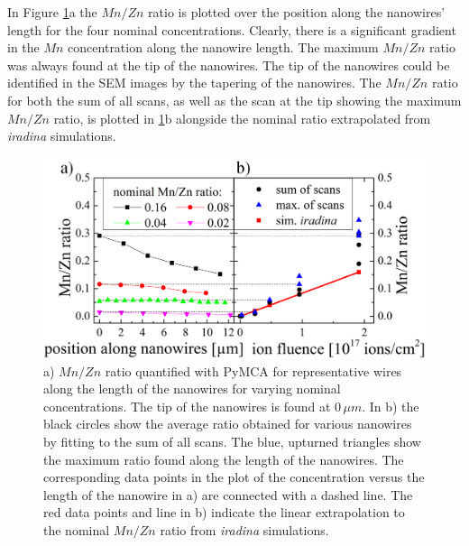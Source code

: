 In Figure \ref{MnZn1}a the $Mn/Zn$ ratio is plotted over the position along the nanowires' length for the four nominal concentrations. Clearly, there is a significant gradient in the $Mn$ concentration along the nanowire length. The maximum $Mn/Zn$ ratio was always found at the tip of the nanowires. The tip of the nanowires could be identified in the SEM images by the tapering of the nanowires. The $Mn/Zn$ ratio for both the sum of all scans, as well as the scan at the tip showing the maximum $Mn/Zn$ ratio, is plotted in \ref{MnZn1}b alongside the nominal ratio extrapolated from \emph{iradina} simulations.

\begin{figure}[h]
	\centering
		\includegraphics[width=.88\textwidth]{images/MnZn1.png}
	\caption{a) $Mn/Zn$ ratio quantified with PyMCA for representative wires along the length of the nanowires for varying nominal concentrations. The tip of the nanowires is found at $0\,\mu m$. In b) the black circles show the average ratio obtained for various nanowires by fitting to the sum of all scans. The blue, upturned triangles show the maximum ratio found along the length of the nanowires. The corresponding data points in the plot of the concentration versus the length of the nanowire in a) are connected with a dashed line. The red data points and line in b) indicate the linear extrapolation to the nominal $Mn/Zn$ ratio from \emph{iradina} simulations.}
	\label{MnZn1}
\end{figure} 
 
